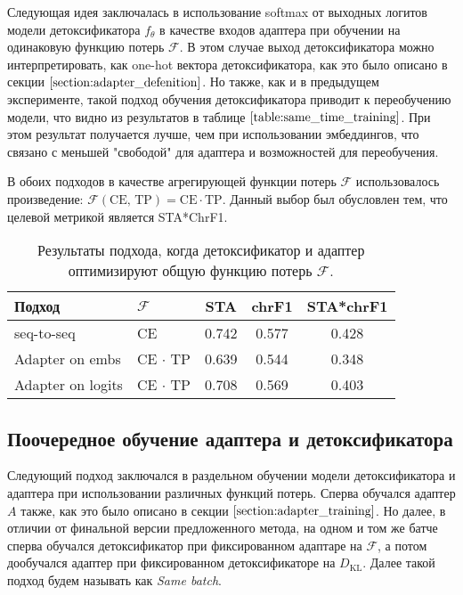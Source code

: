 Следующая идея заключалась в использование softmax от выходных логитов модели детоксификатора $f_{\theta}$ в качестве входов адаптера при обучении на одинаковую функцию потерь $\mathcal{F}$. 
В этом случае выход детоксификатора можно интерпретировать, как one-hot вектора детоксификатора, как это было описано в секции $\ref{section:adapter_defenition}$.
Но также, как и в предыдущем эксперименте, такой подход обучения детоксификатора приводит к переобучению модели, что видно из результатов в таблице $\ref{table:same_time_training}$.
При этом результат получается лучше, чем при использовании эмбеддингов, что связано с меньшей "свободой" для адаптера и возможностей для переобучения. 

В обоих подходов в качестве агрегирующей функции потерь $\mathcal{F}$ использовалось произведение: $\mathcal{F}(\text{CE, TP}) = \text{CE} \cdot \text{TP}$. 
Данный выбор был обусловлен тем, что целевой метрикой является STA*ChrF1.

\begin{table}[ht]
\centering
 \begin{tabular}{|l l|c c c|} 
 \hline
 Подход & $\mathcal{F}$ & STA & chrF1 & STA*chrF1 \\ [0.5ex] 
 \hline
 seq-to-seq & CE & 0.742 & 0.577 & 0.428  \\ 
 Adapter on embs & CE $\cdot$ TP & 0.639 & 0.544 & 0.348 \\
 Adapter on logits  & CE $\cdot$ TP & 0.708 & 0.569 & 0.403 \\
  \hline
 \end{tabular}
\caption{Результаты подхода, когда детоксификатор и адаптер оптимизируют общую функцию потерь $\mathcal{F}$.}
\label{table:same_time_training}
\end{table}

\subsection{Поочередное обучение адаптера и детоксификатора}
Следующий подход заключался в раздельном обучении модели детоксификатора и адаптера при использовании различных функций потерь. 
Сперва обучался адаптер $A$ также, как это было описано в секции $\ref{section:adapter_training}$. 
Но далее, в отличии от финальной версии предложенного метода, на одном и том же батче сперва обучался детоксификатор при фиксированном адаптаре на $\mathcal{F}$, а потом дообучался адаптер при фиксированном детоксификаторе на $D_{\text{KL}}$.
Далее такой подход будем называть как \textit{Same batch}.


